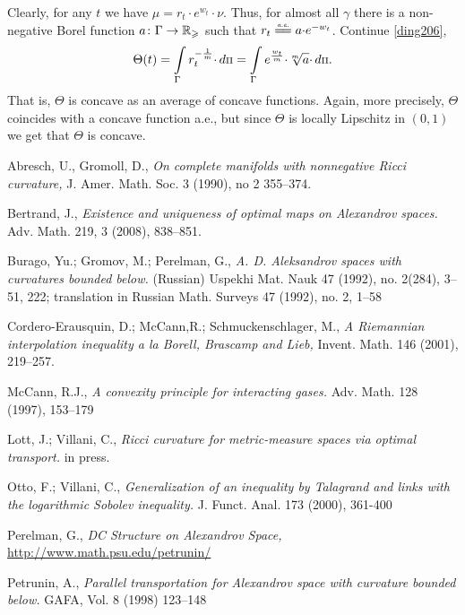 \documentclass[oneside,a4paper]{article}
\begin{document}
Clearly, for any $t$ we have
$\mu=r_t{\cdot} e^{w_t}{\cdot}\nu$.
Thus, for almost all $\gamma$ there is a non-negative Borel function $a\colon\Gamma\to\mathbb{R}_\geqslant$ such that $r_t\ae a {\cdot}e^{-w_t}$.
Continue \ref{ding206},
$$\Theta(t)
=
\int\limits_\Gamma r_t^{-\frac1m}{\cdot}\,d\text{\scriptsize $\Pi$}
=
\int\limits_\Gamma{e^{\frac{w_t}m}}{\cdot}{\sqrt[m]{a}}{\cdot}\,d\text{\scriptsize $\Pi$}.
$$
That is, $\Theta$ is concave as an average of concave functions.
Again, more precisely, $\Theta$ coincides with a concave function a.e., but since $\Theta$ is locally Lipschitz in $(0,1)$ we get that $\Theta$ is concave. \qeds




\begin{thebibliography}{3} 
 Abresch, U., Gromoll, D., \textit{On complete manifolds with nonnegative Ricci curvature,} J. Amer. Math. Soc. 3 (1990), no 2 355--374.

Bertrand, J., \textit{Existence and uniqueness of optimal maps on Alexandrov spaces.}
Adv. Math. 219, 3 (2008), 838--851.

 Burago, Yu.; Gromov, M.; Perelman, G., \textit{A. D. Aleksandrov spaces
with curvatures bounded below.} (Russian)  Uspekhi Mat. Nauk  47  (1992),  no.
2(284), 3--51, 222;  translation in  Russian Math. Surveys  47  (1992),  no. 2, 1--58

 Cordero-Erausquin, D.; McCann,R.;  Schmuckenschlager, M., \textit{A Riemannian interpolation inequality a la Borell, Brascamp and Lieb,} Invent. Math. 146 (2001), 219--257.

 McCann, R.J., \textit{A convexity principle for interacting gases.}
Adv. Math. 128 (1997), 153--179

 Lott, J.; Villani, C., \textit{Ricci curvature for metric-measure spaces via optimal transport.} in press.

 Otto, F.;  Villani, C., \textit{Generalization of an inequality by Talagrand and links
with the logarithmic Sobolev inequality.}
J. Funct. Anal. 173 (2000), 361-400


 Perelman, G., \textit{DC Structure on Alexandrov Space,}\\ \href{http://www.math.psu.edu/petrunin/papers/papers.html}{http://www.math.psu.edu/petrunin/}

 Petrunin, A., \textit{Parallel transportation for Alexandrov space with curvature bounded below.}  GAFA, Vol. 8 (1998) 123--148


\end{thebibliography}
\end{document}
